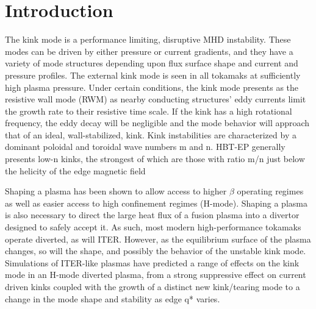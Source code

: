 \documentclass[aps,prl,twocolumn,superscriptaddress,groupedaddress]{revtex4}  %
\begin{document}
\section{Introduction}
The kink mode is a performance limiting, disruptive MHD instability\cite{Strait}.  These modes can be driven by either pressure or current gradients, and they have a variety of mode structures depending upon flux surface shape and current and pressure profiles.  The external kink mode is seen in all tokamaks at sufficiently high plasma pressure.  Under certain conditions, the kink mode presents as the resistive wall mode (RWM) as nearby conducting structures' eddy currents limit the growth rate to their resistive time scale.  If the kink has a high rotational frequency, the eddy decay will be negligible and the mode behavior will approach that of an ideal, wall-stabilized, kink.  Kink instabilities are characterized by a dominant poloidal and toroidal wave numbers m and n.  HBT-EP generally presents low-n kinks, the strongest of which are those with ratio m/n just below the helicity of the edge magnetic field\par
	Shaping a plasma has been shown to allow access to higher $\beta$ operating regimes as well as easier access to high confinement regimes (H-mode)\citep{Lazarus, Keilhacker_HMode}. Shaping a plasma is also necessary to direct the large heat flux of a fusion plasma into a divertor designed to safely accept it.  As such, most modern high-performance tokamaks operate diverted, as will ITER.  However, as the equilibrium surface of the plasma changes, so will the shape, and possibly the behavior of the unstable kink mode.  Simulations of ITER-like plasmas have predicted a range of effects on the kink mode in an H-mode diverted plasma, from a strong suppressive effect on current driven kinks coupled with the growth of a distinct new kink/tearing mode\cite{Huysmans} to a change in the mode shape and stability as edge q* varies\cite{Maurer}.\par
\end{document}
